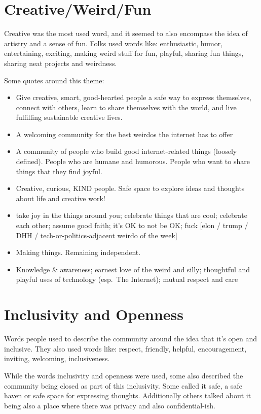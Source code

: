 \documentclass[
]{book}
\providecommand{\tightlist}{%
  \setlength{\itemsep}{0pt}\setlength{\parskip}{0pt}}
\begin{document}
\section{Creative/Weird/Fun}\label{creativeweirdfun}

Creative was the most used word, and it seemed to also encompass the idea of artistry and a sense of fun. Folks used words like: enthusiastic, humor, entertaining, exciting, making weird stuff for fun, playful, sharing fun things, sharing neat projects and weirdness.

Some quotes around this theme:

\begin{itemize}
\tightlist
\item
  Give creative, smart, good-hearted people a safe way to express themselves, connect with others, learn to share themselves with the world, and live fulfilling sustainable creative lives.
\item
  A welcoming community for the best weirdos the internet has to offer
\item
  A community of people who build good internet-related things (loosely defined). People who are humane and humorous. People who want to share things that they find joyful.
\item
  Creative, curious, KIND people. Safe space to explore ideas and thoughts about life and creative work!
\item
  take joy in the things around you; celebrate things that are cool; celebrate each other; assume good faith; it's OK to not be OK; fuck {[}elon / trump / DHH / tech-or-politics-adjacent weirdo of the week{]}
\item
  Making things. Remaining independent.
\item
  Knowledge \& awareness; earnest love of the weird and silly; thoughtful and playful uses of technology (esp.~The Internet); mutual respect and care
\end{itemize}

\section{Inclusivity and Openness}\label{inclusivity-and-openness}

Words people used to describe the community around the idea that it's open and inclusive. They also used words like: respect, friendly, helpful, encouragement, inviting, welcoming, inclusiveness.

While the words inclusivity and openness were used, some also described the community being closed as part of this inclusivity. Some called it safe, a safe haven or safe space for expressing thoughts. Additionally others talked about it being also a place where there was privacy and also confidential-ish.
\end{document}
